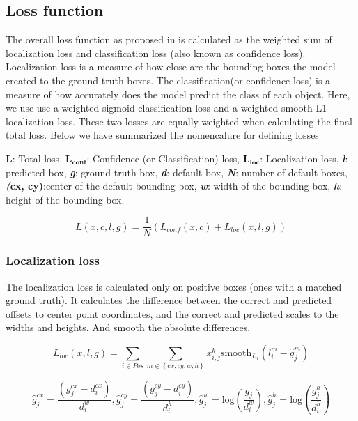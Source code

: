 \documentclass{article}
\begin{document}
\subsection{Loss function}

The overall loss function as proposed in \cite{liu2016ssd} is calculated as the weighted sum of localization loss and classification loss (also known as confidence loss). Localization loss is a measure of how close are the bounding boxes the model created to the ground truth boxes. The classification(or confidence loss) is a measure of how accurately does the model predict the class of each object. Here, we use use a weighted sigmoid classification loss and a weighted smooth L1 localization loss. These two losses are equally weighted when calculating the final total loss. Below we have summarized the nomencalure for defining losses

$\bm{L}$: Total loss, $\bm{L_{conf}}$: Confidence (or Classification) loss, $\bm{L_{loc}}$: Localization loss, \textbf{\textit{l}}: predicted box, \textbf{\textit{g}}: ground truth box, \textbf{\textit{d}}: default box, \textbf{\textit{N}}: number of default boxes, \textbf{\textit(cx, cy)}:center of the default bounding box, \textbf{\textit{w}}: width of the bounding box, \textbf{\textit{h}}: height of the bounding box.

\begin{equation}
L(x,c,l,g)=\frac{1}{N}(L_{conf}(x,c)+L_{loc}(x,l,g))
\end{equation}

\subsubsection{Localization loss}

The localization loss is calculated only on positive boxes (ones with a matched ground truth). It calculates the difference between the correct and predicted offsets to center point coordinates, and the correct and predicted scales to the widths and heights. And smooth the absolute differences.

\begin{equation}
L_{loc}(x,l,g)=\sum_{i \in Pos}\sum_{m \in \left\{ cx, cy, w,h\right\}}x_{i,j}^{k}\text{smooth}_{L_{1}}(l_{i}^{m}-\hat{g}_{j}^{m})
\end{equation}

\begin{equation}
\hat{g}_{j}^{cx}=\frac{(g_{j}^{cx}-d_{i}^{cx})}{d_{i}^{w}}, \hat{g}_{j}^{cy}=\frac{(g_{j}^{cy}-d_{i}^{cy})}{d_{i}^{h}}, \hat{g}_{j}^{w} =\text{log}(\frac{g_{j}}{d_{i}^{w}}), \hat{g}_{j}^{h}=\text{log}(\frac{g_{j}^{h}}{d_{i}^{h}}) 
\end{equation}
\end{document}
